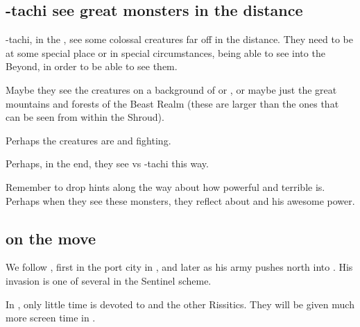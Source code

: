 \subsection{\Shilred{}-tachi see great monsters in the distance}
\Shilred-tachi, \travelling in the \Wylde{}, see some colossal creatures far off in the distance. They need to be at some special place or in special circumstances, being able to see into the Beyond, in order to be able to see them. 

Maybe they see the creatures on a background of \Nyx{} or \Machai{}, or maybe just the great mountains and forests of the Beast Realm (these are larger than the ones that can be seen from within the Shroud). 

Perhaps the creatures are \dragons{} and \banes{} fighting. 

Perhaps, in the end, they see \Ishnaruchaefir{} vs \Teshrial-tachi this way. 

Remember to drop hints along the way about how powerful and terrible \Ishnaruchaefir{} is. Perhaps when they see these monsters, they reflect about \Ishnaruchaefir{} and his awesome power. 







\subsection{\Narkiza{} on the move}

We follow \Narkiza{}, first in the port city in \Scyrum, and later as his army pushes north into \Velcad{}. His invasion is one of several  in the Sentinel scheme.

In \TwilightAngelRememberEmph, only little time is devoted to \Narkiza{} and the other Rissitics. They will be given much more screen time in \emph{\CarzainWithRedcorBook}. 














